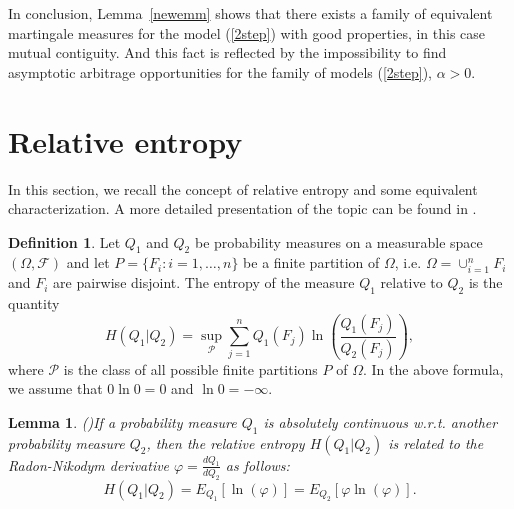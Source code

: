 \documentclass[reqno,a4paper]{amsart}
\theoremstyle{plain}
\theoremstyle{definition}
\newtheorem{definition}{Definition}
\theoremstyle{plain}
\newtheorem{lemma}{Lemma}
\theoremstyle{plain}
\theoremstyle{plain}
\begin{document}
In conclusion, Lemma~\ref{newemm} shows that there exists a family of equivalent martingale measures for the model (\ref{2step}) with good properties, in this case mutual contiguity. And this fact is reflected by the impossibility to find asymptotic arbitrage opportunities for the family of models (\ref{2step}), $\alpha>0$.

\appendix
\section{Relative entropy}\label{A1}
In this section, we recall the concept of relative entropy and some equivalent characterization. A more detailed presentation of the topic can be found in \cite{Hihi}.
\begin{definition}\label{a1.1}
 Let $Q_1$ and $Q_2$ be probability measures on a measurable space $(\Omega,{{\mathcal F}})$ and let $P=\{F_i: i=1,\ldots,n\}$ be a finite partition of $\Omega$, i.e. $\Omega=\cup_{i=1}^nF_i$ and $F_i$ are pairwise disjoint. The entropy of the measure $Q_1$ relative to $Q_2$ is the quantity
 $$H(Q_1|Q_2)=\sup_{{\mathcal P}}\sum_{j=1}^nQ_1(F_j)\ln\left(\frac{Q_1(F_j)}{Q_2(F_j)}\right),$$
 where ${{\mathcal P}}$ is the class of all possible finite partitions $P$ of $\Omega$. In the above formula, we assume  that $0\ln0=0$ and $\ln0=-\infty$.
\end{definition}

\begin{lemma}(\cite[Lemma 6.1]{Hihi})\label{a1.2}
 If a probability measure $Q_1$ is absolutely continuous w.r.t. another probability measure $Q_2$, then the relative entropy $H(Q_1|Q_2)$ is related to the Radon-Nikodym derivative ${\varphi}=\frac{dQ_1}{dQ_2}$ as follows:
 $$H(Q_1|Q_2)=E_{Q_1}[\ln({\varphi})]=E_{Q_2}[{\varphi}\ln({\varphi})].$$
 \end{lemma}



\end{document}
